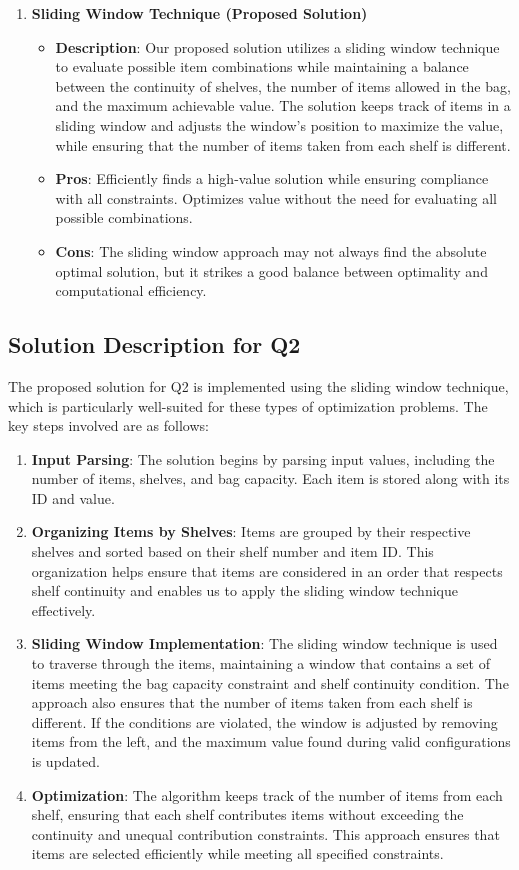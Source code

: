 \documentclass{article}
\begin{document}
\begin{enumerate}
    \item \textbf{Sliding Window Technique (Proposed Solution)}
    \begin{itemize}
        \item \textbf{Description}: Our proposed solution utilizes a sliding window technique to evaluate possible item combinations while maintaining a balance between the continuity of shelves, the number of items allowed in the bag, and the maximum achievable value. The solution keeps track of items in a sliding window and adjusts the window's position to maximize the value, while ensuring that the number of items taken from each shelf is different.
        \item \textbf{Pros}: Efficiently finds a high-value solution while ensuring compliance with all constraints. Optimizes value without the need for evaluating all possible combinations.
        \item \textbf{Cons}: The sliding window approach may not always find the absolute optimal solution, but it strikes a good balance between optimality and computational efficiency.
    \end{itemize}
\end{enumerate}

\subsection{Solution Description for Q2}
The proposed solution for Q2 is implemented using the sliding window technique, which is particularly well-suited for these types of optimization problems. The key steps involved are as follows:

\begin{enumerate}
    \item \textbf{Input Parsing}: The solution begins by parsing input values, including the number of items, shelves, and bag capacity. Each item is stored along with its ID and value.
    \item \textbf{Organizing Items by Shelves}: Items are grouped by their respective shelves and sorted based on their shelf number and item ID. This organization helps ensure that items are considered in an order that respects shelf continuity and enables us to apply the sliding window technique effectively.
    \item \textbf{Sliding Window Implementation}: The sliding window technique is used to traverse through the items, maintaining a window that contains a set of items meeting the bag capacity constraint and shelf continuity condition. The approach also ensures that the number of items taken from each shelf is different. If the conditions are violated, the window is adjusted by removing items from the left, and the maximum value found during valid configurations is updated.
    \item \textbf{Optimization}: The algorithm keeps track of the number of items from each shelf, ensuring that each shelf contributes items without exceeding the continuity and unequal contribution constraints. This approach ensures that items are selected efficiently while meeting all specified constraints.
\end{enumerate}
\end{document}
